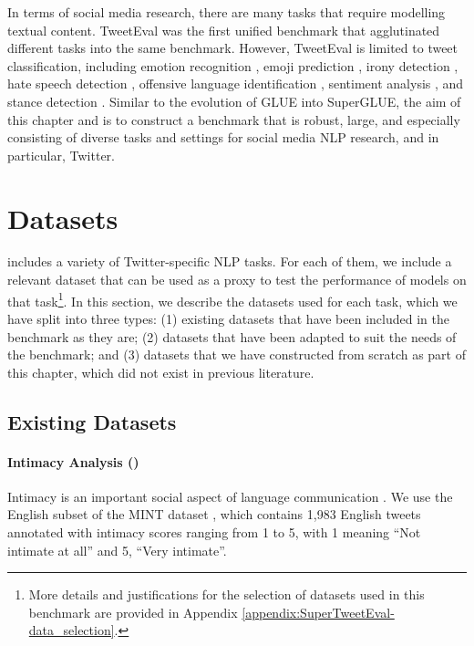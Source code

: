 In terms of social media research, there are many tasks that require modelling textual content. TweetEval \cite{barbieri-etal-2020-tweeteval} was the first unified benchmark that agglutinated different tasks into the same benchmark. However, TweetEval is limited to tweet classification, including emotion recognition \cite{mohammad-etal-2018-semeval}, emoji prediction \cite{barbieri2018semeval}, irony detection \cite{van2018semeval}, hate speech detection \cite{basile2019semeval},  offensive language identification \cite{zampieri-etal-2019-semeval}, sentiment analysis \cite{rosenthal-etal-2017-semeval}, and stance detection \cite{mohammad-etal-2016-semeval}. Similar to the evolution of GLUE into SuperGLUE, the aim of this chapter and {\DATASET} is to construct a benchmark that is robust, large, and especially consisting of diverse tasks and settings for social media NLP research, and in particular, Twitter.

\section{Datasets}
{\DATASET} includes a variety of Twitter-specific NLP tasks. For each of them, we include a relevant dataset that can be used as a proxy to test the performance of models on that task\footnote{More details and justifications for the selection of datasets used in this benchmark are provided in Appendix \ref{appendix:SuperTweetEval-data_selection}.}. In this section, we describe the datasets used for each task, which we have split into three types: (1) existing datasets that have been included in the benchmark as they are; (2) datasets that have been adapted to suit the needs of the benchmark; and (3) datasets that we have constructed from scratch as part of this chapter, which did not exist in previous literature. 

\subsection{Existing Datasets}
\paragraph{Intimacy Analysis ({\TweetIntimacy})} Intimacy is an important social aspect of language communication \citep{pei2020quantifying}. We use the English subset of the \textsc{MINT} dataset \citep{pei2022semeval}, which contains 1,983 English tweets annotated with intimacy scores ranging from 1 to 5, with 1 meaning ``Not intimate at all'' and 5, ``Very intimate''. 

